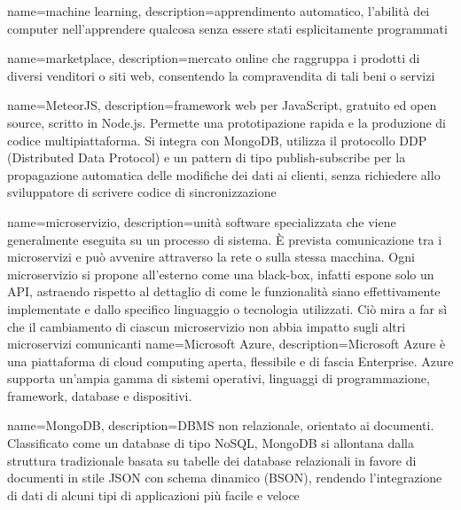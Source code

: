 

{
	name=machine learning,
	description={apprendimento automatico, l'abilità dei computer nell'apprendere qualcosa senza essere stati esplicitamente programmati}
}	

{
	name=marketplace,
	description={mercato online che raggruppa i prodotti di diversi venditori o siti web, consentendo la compravendita di tali beni o servizi}
}

{
	name=MeteorJS,
	description={framework web per JavaScript, gratuito ed open source, scritto in Node.js. Permette una prototipazione rapida e la produzione di codice multipiattaforma. Si integra con MongoDB, utilizza il protocollo DDP (Distributed Data Protocol) e un pattern di tipo publish-subscribe per la propagazione automatica delle modifiche dei dati ai clienti, senza richiedere allo sviluppatore di scrivere codice di sincronizzazione}
}		

{
	name=microservizio,
	description={unità software specializzata che viene generalmente eseguita su un processo di sistema. \MakeUppercase{è} prevista comunicazione tra i microservizi e può avvenire attraverso la rete o sulla stessa macchina. Ogni microservizio si propone all’esterno come una black-box, infatti espone solo un API, astraendo rispetto al dettaglio di come le funzionalità siano effettivamente implementate e dallo specifico linguaggio o tecnologia utilizzati. Ciò mira a far sì che il cambiamento di ciascun microservizio non abbia impatto sugli altri microservizi comunicanti}
}
{
	name=Microsoft Azure,
	description={Microsoft Azure è una piattaforma di cloud computing aperta, flessibile e di fascia Enterprise. Azure supporta un'ampia gamma di sistemi operativi, linguaggi di programmazione, framework, database e dispositivi.}
}			

{
	name=MongoDB,
	description={DBMS non relazionale, orientato ai documenti. Classificato come un database di tipo NoSQL, MongoDB si allontana dalla struttura tradizionale basata su tabelle dei database relazionali in favore di documenti in stile JSON con schema dinamico (BSON), rendendo l'integrazione di dati di alcuni tipi di applicazioni più facile e veloce}
}	

